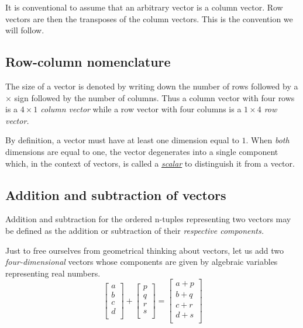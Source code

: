 \documentclass[
  a4paper,
]{article}
\begin{document}
It is conventional to assume that an arbitrary vector is a column
vector. Row vectors are then the transposes of the column vectors. This
is the convention we will follow.

\hypertarget{row-column-nomenclature}{%
\subsection{Row-column nomenclature}\label{row-column-nomenclature}}

The size of a vector is denoted by writing down the number of rows
followed by a \(\times\) sign followed by the number of columns. Thus a
column vector with four rows is a \emph{\(4 \times 1\) column vector}
while a row vector with four columns is a \emph{\(1 \times 4\) row
vector.}

By definition, a vector must have at least one dimension equal to \(1\).
When \emph{both} dimensions are equal to one, the vector degenerates
into a single component which, in the context of vectors, is called a
\href{https://en.wikipedia.org/wiki/Scalar_\%28mathematics\%29}{\emph{scalar}}
to distinguish it from a vector.

\hypertarget{addition-and-subtraction-of-vectors}{%
\subsection{Addition and subtraction of
vectors}\label{addition-and-subtraction-of-vectors}}

Addition and subtraction for the ordered n-tuples representing two
vectors may be defined as the addition or subtraction of their
\emph{respective components.}

Just to free ourselves from geometrical thinking about vectors, let us
add two \emph{four-dimensional} vectors whose components are given by
algebraic variables representing real numbers. \[
\begin{bmatrix}a\\b\\c\\d\\\end{bmatrix} + \begin{bmatrix}p\\q\\r\\s\\\end{bmatrix} = \begin{bmatrix}a+p\\b+q\\c+r\\d+s\\\end{bmatrix}
\]
\end{document}
